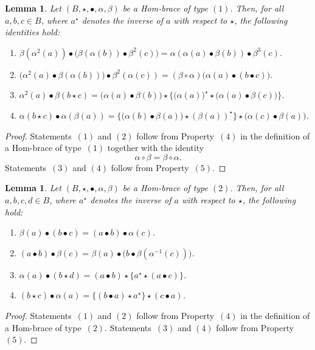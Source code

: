 \documentclass[14pt]{article}
\newtheorem{lemma}[thm]{Lemma}
\theoremstyle{Definition}
\theoremstyle{remark}
\begin{document}
\begin{lemma}
Let $(B,\star,\bullet,\alpha,\beta)$ be a Hom-brace of type $(1)$. Then, for all $a,b,c \in B$, where $a^{\star}$ denotes the inverse of $a$ with respect to $\star$, the following identities hold:
\begin{enumerate}
\item $\beta(\alpha^{2}(a)) \bullet \bigl(\beta(\alpha(b)) \bullet \beta^{2}(c)\bigr) 
= \alpha(\alpha(a)\bullet \beta(b)) \bullet \beta^{3}(c)$.
\item $\bigl(\alpha^{2}(a)\bullet \beta(\alpha(b))\bigr)\bullet \beta^{2}(\alpha(c)) 
= (\beta \circ \alpha)\bigl(\alpha(a)\bullet (b\bullet c)\bigr)$.
\item $\alpha^{2}(a)\bullet \beta(b\star c) 
= \bigl(\alpha(a)\bullet \beta(b)\bigr)\star\{\bigl(\alpha(a)\bigr)^{\star} \star \bigl(\alpha(a)\bullet \beta(c)\bigr)\}$.
\item $\alpha(b\star c)\bullet \alpha(\beta(a)) 
=\{ \bigl(\alpha(b)\bullet \beta(a)\bigr)\star (\beta(a))^{\star}\} \star \bigl(\alpha(c)\bullet \beta(a)\bigr)$.
\end{enumerate}
\end{lemma}
\begin{proof}
Statements~$(1)$ and $(2)$ follow from Property~$(4)$ in the definition of a Hom-brace of type~$(1)$ together with the identity
\[
\alpha\circ\beta=\beta\circ\alpha.
\]
Statements~$(3)$ and $(4)$ follow from Property~$(5)$.
\end{proof}

\begin{lemma}
Let $(B,\star,\bullet,\alpha,\beta)$ be a Hom-brace of type $(2)$. Then, for all $a,b,c,d \in B$, where $a^{\star}$ denotes the inverse of $a$ with respect to $\star$, the following hold:
\begin{enumerate}
\item[1.] $\beta(a)\bullet(b\bullet c)=(a\bullet b)\bullet \alpha(c)$.
\item[2.] $(a\bullet b)\bullet\beta(c)=\beta(a)\bullet\bigl(b\bullet\beta(\alpha^{-1}(c))\bigr)$.
\item[3.] $\alpha(a)\bullet(b\star d)=(a\bullet b)\star\{ a^{\star}\star (a\bullet c)\}$.
\item[4.] $(b\star c)\bullet \alpha(a)=\{(b\bullet a)\star a^{\star}\}\star(c\bullet a)$.
\end{enumerate}
\end{lemma}
\begin{proof}
Statements~$(1)$ and $(2)$ follow from Property~$(4)$ in the definition of a Hom-brace of type~$(2)$. Statements~$(3)$ and $(4)$ follow from Property~$(5)$.
\end{proof}
\end{document}
